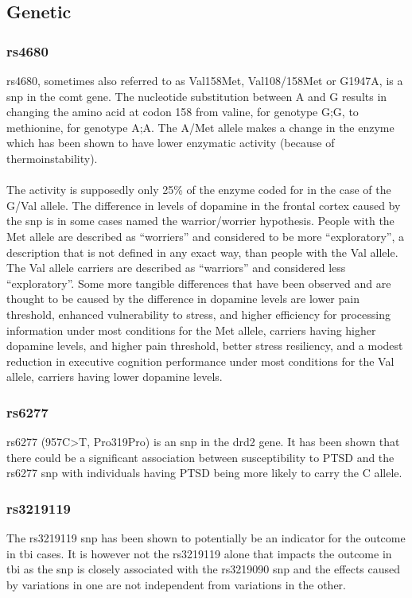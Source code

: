 \documentclass[11pt]{article}
\begin{document}
\subsection{Genetic}

\subsubsection{rs4680}
rs4680, sometimes also referred to as Val158Met, Val108/158Met or G1947A, is a \gls{snp} in the \gls{comt} gene. The nucleotide substitution between A and G results in changing the amino acid at codon 158 from valine, for genotype G;G, to methionine, for genotype A;A. The A/Met allele makes a change in the enzyme which has been shown to have lower enzymatic activity (because of thermoinstability).\cite{Rs46802020}\\
\\
The activity is supposedly only 25\% of the enzyme coded for in the case of the G/Val allele. The difference in levels of dopamine in the frontal cortex caused by the \gls{snp} is in some cases named the warrior/worrier hypothesis. People with the Met allele are described as ``worriers'' and considered to be more ``exploratory'', a description that is not defined in any exact way\cite{ExploratoryBehaviorOverview}, than people with the Val allele. The Val allele carriers are described as ``warriors'' and considered less ``exploratory''. Some more tangible differences that have been observed and are thought to be caused by the difference in dopamine levels are lower pain threshold, enhanced vulnerability to stress, and higher efficiency for processing information under most conditions for the Met allele, carriers having higher dopamine levels, and higher pain threshold, better stress resiliency, and a modest reduction in executive cognition performance under most conditions for the Val allele, carriers having lower dopamine levels.\cite{Rs4680edia}
\cite{Rs4680snpedia}

\subsubsection{rs6277}
rs6277 (957C>T, Pro319Pro) is an \gls{snp} in the \gls{drd2} gene\cite{Rs6277SNPedia}. It has been shown that there could be a significant association between susceptibility to PTSD and the rs6277 \gls{snp} with individuals having PTSD being more likely to carry the C allele\cite{voiseyDRD2Gene957C2009}.
\subsubsection{rs3219119}
The rs3219119 \gls{snp} has been shown to potentially be an indicator for the outcome in \gls{tbi} cases. It is however not the rs3219119 alone that impacts the outcome in \gls{tbi} as the \gls{snp} is closely associated with the rs3219090 \gls{snp} and the effects caused by variations in one are not independent from variations in the other.\cite{sarnaikInfluencePARP1Polymorphisms2010}
\end{document}

